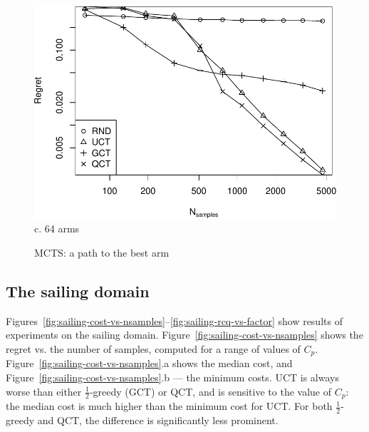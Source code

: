\documentclass{article}
\begin{document}
\begin{figure}
\begin{minipage}[c]{0.5\linewidth}
    \includegraphics[scale=0.4]{tree-identity-k=64-uqb=8.pdf} \\
    c. 64 arms
 \end{minipage}
  \label{fig:mcts-regret}
  \caption{MCTS: a path to the best arm}
\end{figure}

\subsection{The sailing domain}
\label{sec:emp-sailing}

Figures~\ref{fig:sailing-cost-vs-nsamples}--\ref{fig:sailing-rcq-vs-factor}
show results of experiments on the sailing
domain. Figure~\ref{fig:sailing-cost-vs-nsamples} shows the regret
vs. the number of samples, computed for a range of values of
$C_p$. Figure~\ref{fig:sailing-cost-vs-nsamples}.a shows the median
cost, and Figure~\ref{fig:sailing-cost-vs-nsamples}.b --- the minimum
costs. UCT is always worse than either $\frac 1 2$-greedy (GCT) or QCT, and is sensitive to
the value of $C_p$: the median cost is much higher than the minimum
cost for UCT. For both $\frac 1 2$-greedy and QCT, the difference is
significantly less prominent.
\end{document}
